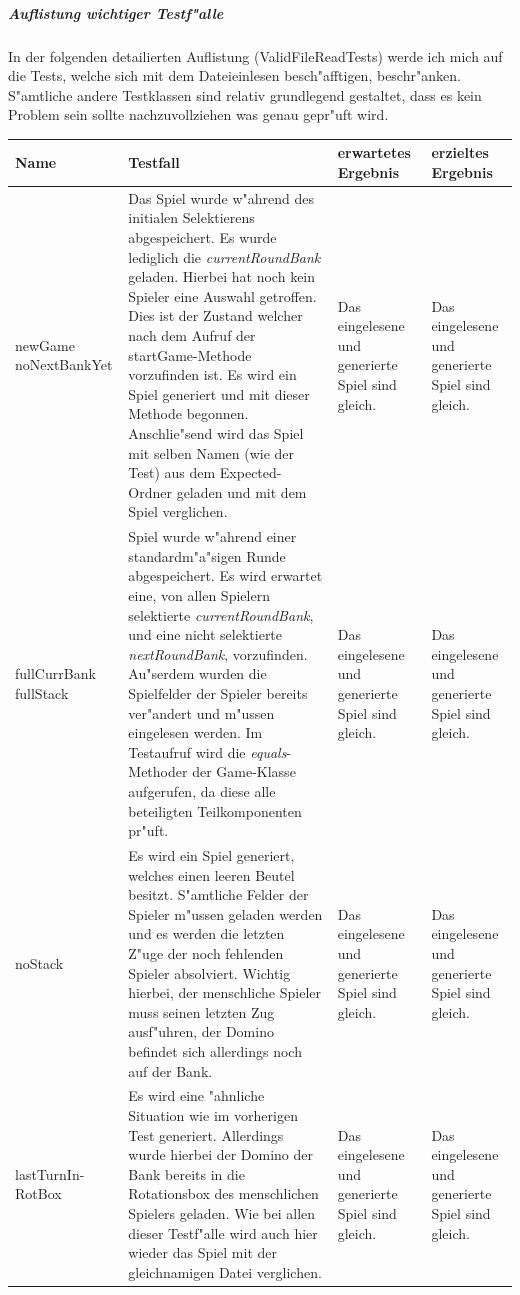 \subparagraph{Auflistung wichtiger Testf"alle}
In der folgenden detailierten Auflistung (ValidFileReadTests) werde ich mich auf die Tests, welche sich mit dem Dateieinlesen besch"afftigen, beschr"anken. S"amtliche andere Testklassen sind relativ grundlegend gestaltet, dass es kein Problem sein sollte nachzuvollziehen was genau gepr"uft wird. 

\bigbreak

\begin{tabular}{|p{2cm}|p{7cm}|p{2cm}|p{2cm}|}
	\hline
	Name & Testfall & erwartetes Ergebnis & erzieltes Ergebnis \\
	\hline
	\hline
	newGame noNextBankYet & Das Spiel wurde w"ahrend des initialen Selektierens abgespeichert. Es wurde lediglich die \emph{currentRoundBank} geladen. Hierbei hat noch kein Spieler eine Auswahl getroffen. Dies ist der Zustand welcher nach dem Aufruf der startGame-Methode vorzufinden ist. Es wird ein Spiel generiert und mit dieser Methode begonnen. Anschlie"send wird das Spiel mit selben Namen (wie der Test) aus dem Expected-Ordner geladen und mit dem Spiel verglichen. & Das eingelesene und generierte Spiel sind gleich. & Das eingelesene und generierte Spiel sind gleich. \\
		
	fullCurrBank fullStack & Spiel wurde w"ahrend einer standardm"a"sigen Runde abgespeichert. Es wird erwartet eine, von allen Spielern selektierte \emph{currentRoundBank}, und eine nicht selektierte \emph{nextRoundBank}, vorzufinden. Au"serdem wurden die Spielfelder der Spieler bereits ver"andert und m"ussen eingelesen werden. Im Testaufruf wird die \emph{equals}-Methoder der Game-Klasse aufgerufen, da diese alle beteiligten Teilkomponenten pr"uft. & Das eingelesene und generierte Spiel sind gleich. & Das eingelesene und generierte Spiel sind gleich. \\
	
	noStack & Es wird ein Spiel generiert, welches einen leeren Beutel besitzt. S"amtliche Felder der Spieler m"ussen geladen werden und es werden die letzten Z"uge der noch fehlenden Spieler absolviert. Wichtig hierbei, der menschliche Spieler muss seinen letzten Zug ausf"uhren, der Domino befindet sich allerdings noch auf der Bank. & Das eingelesene und generierte Spiel sind gleich. & Das eingelesene und generierte Spiel sind gleich. \\
	
	lastTurnIn- \newline RotBox & Es wird eine "ahnliche Situation wie im vorherigen Test generiert. Allerdings wurde hierbei der Domino der Bank bereits in die Rotationsbox des menschlichen Spielers geladen. Wie bei allen dieser Testf"alle wird auch hier wieder das Spiel mit der gleichnamigen Datei verglichen. & Das eingelesene und generierte Spiel sind gleich. & Das eingelesene und generierte Spiel sind gleich. \\	
	\hline
\end{tabular}

